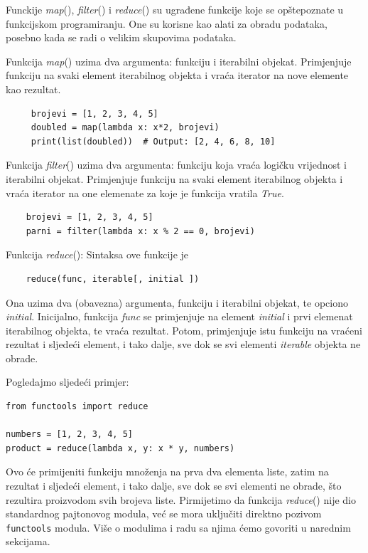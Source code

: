 Funckije \textit{map}(), \textit{filter}() i \textit{reduce}() su ugrađene funkcije koje se opštepoznate u funkcijskom programiranju. One su korisne kao alati za obradu podataka, posebno kada se radi o velikim skupovima podataka.

Funkcija \textit{map}() uzima dva argumenta: funkciju i iterabilni objekat. Primjenjuje funkciju  na svaki element iterabilnog objekta i vraća iterator na nove elemente kao rezultat. 

\begin{verbatim}
     brojevi = [1, 2, 3, 4, 5]
     doubled = map(lambda x: x*2, brojevi)
     print(list(doubled))  # Output: [2, 4, 6, 8, 10]
\end{verbatim}


Funkcija \textit{filter}() uzima dva argumenta: funkciju koja vraća logičku vrijednost i iterabilni objekat. Primjenjuje funkciju na svaki element iterabilnog objekta i vraća iterator na one elemenate za koje je funkcija vratila \emph{True}. 
\begin{verbatim}
	brojevi = [1, 2, 3, 4, 5]
	parni = filter(lambda x: x % 2 == 0, brojevi)
\end{verbatim}

Funkcija  \textit{reduce}(): Sintaksa ove funkcije je

\begin{verbatim}
	reduce(func, iterable[, initial ])
\end{verbatim}

Ona uzima dva (obavezna) argumenta,  funkciju i iterabilni objekat, te opciono \textit{initial}. Inicijalno, funkcija \textit{func} se primjenjuje na element \emph{initial} i prvi elemenat iterabilnog objekta, te vraća rezultat. Potom,    primjenjuje istu funkciju na vraćeni rezultat i sljedeći element, i tako dalje, sve dok se svi elementi \emph{iterable} objekta ne obrade. 

Pogledajmo sljedeći primjer: 
\begin{verbatim}
from functools import reduce

numbers = [1, 2, 3, 4, 5]
product = reduce(lambda x, y: x * y, numbers)
\end{verbatim}

Ovo će primijeniti funkciju množenja na prva dva elementa liste, zatim na rezultat i sljedeći element, i tako dalje, sve dok se svi elementi ne obrade, što rezultira proizvodom svih brojeva liste. Pirmijetimo da funkcija \textit{reduce}() nije dio standardnog pajtonovog modula, već se mora uključiti direktno pozivom \texttt{functools} modula. Više o modulima i radu sa njima ćemo govoriti u narednim sekcijama.



